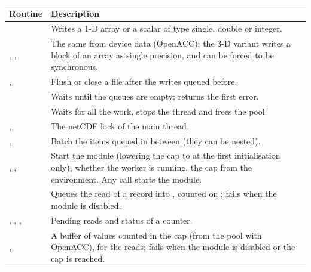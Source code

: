 \begin{longtable}{L{5.6cm} L{8.4cm}}
  \toprule
  \textbf{Routine} & \textbf{Description} \\
  \midrule
  \endhead
  \bottomrule
  \endfoot
   &
    Writes a 1-D array or a scalar of type single, double or integer. \\
  ,
  ,  &
    The same from device data (OpenACC); the 3-D variant writes a block of
    an  array as single precision, and can be forced to be
    synchronous. \\
  ,  &
    Flush or close a file after the writes queued before. \\
   &
    Waits until the queues are empty; returns the first error. \\
   &
    Waits for all the work, stops the thread and frees the pool. \\
  ,  &
    The netCDF lock of the main thread. \\
  ,  &
    Batch the items queued in between (they can be nested). \\
  , ,
   &
    Start the module (lowering the cap to  at the first
    initialisation only), whether the worker is running, the cap from the
    environment. Any call starts the module. \\
   &
    Queues the read of a record into , counted on
    ; fails when the module is disabled. \\
  , , ,
   &
    Pending reads and status of a counter. \\
  ,  &
    A buffer of  values counted in the cap (from the pool with
    OpenACC), for the reads; fails when the module is disabled or the cap
    is reached. \\
\end{longtable}


